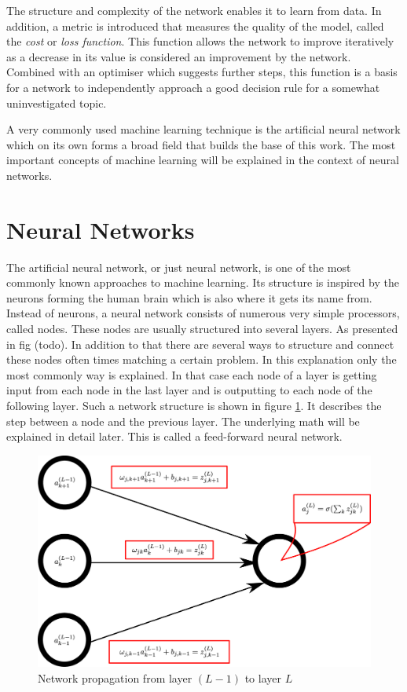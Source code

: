 The structure and complexity of the network enables it to learn from data. In addition, a metric is introduced that measures the quality of the model, called the \emph{cost} or \emph{loss function}. This function allows the network to improve iteratively as a decrease in its value is considered an improvement by the network. Combined with an optimiser which suggests further steps, this function is a basis for a network to independently approach a good decision rule for a somewhat uninvestigated topic.

A very commonly used machine learning technique is the artificial neural network which on its own forms a broad field that builds the base of this work. The most important concepts of machine learning will be explained in the context of neural networks.

\section{Neural Networks}

The artificial neural network, or just neural network, is one of the most commonly known approaches to machine learning. Its structure is inspired by the neurons forming the human brain which is also where it gets its name from.\\
Instead of neurons, a neural network consists of numerous very simple processors, called nodes. These nodes are usually structured into several layers. As presented in fig (todo). In addition to that there are several ways to structure and connect these nodes often times matching a certain problem. In this explanation only the most commonly way is explained. In that case each node of a layer is getting input from each node in the last layer and is outputting to each node of the following layer. Such a network structure is shown in figure \ref{fig:nodes_nomenclature}. It describes the step between a node and the previous layer. The underlying math will be explained in detail later. This is called a feed-forward neural network.

\begin{figure}
	\centering
	\includegraphics[scale=0.18]{figures_ML/nodes_nomenclature.eps}
	\caption{Network propagation from layer $(L-1)$ to layer $L$}
	\label{fig:nodes_nomenclature}
\end{figure}


